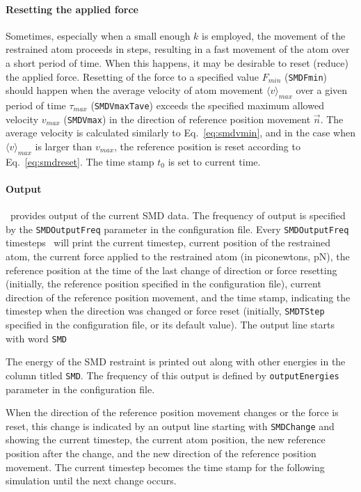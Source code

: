 \paragraph{Resetting the applied force}

Sometimes, especially when a small enough $k$ is employed, the
movement of the restrained atom proceeds in steps, resulting in a fast
movement of the atom over a short period of time. When this happens,
it may be desirable to reset (reduce) the applied force. Resetting of
the force to a specified value $F_{min}$ ({\tt SMDFmin}) should happen
when the average velocity of atom movement $\langle v\rangle_{max}$
over a given period of time $\tau_{max}$ ({\tt SMDVmaxTave}) exceeds
the specified maximum allowed velocity $v_{max}$ ({\tt SMDVmax}) in
the direction of reference position movement $\vec n$. The average
velocity is calculated similarly to Eq.~\ref{eq:smdvmin}, and in the
case when $\langle v\rangle_{max}$ is larger than $v_{max}$, the
reference position is reset according to Eq.~\ref{eq:smdreset}. The
time stamp $t_0$ is set to current time.


\paragraph{Output}

\NAMD\ provides output of the current SMD data. The frequency of
output is specified by the \verb!SMDOutputFreq! parameter in the
configuration file. Every \verb!SMDOutputFreq! timesteps \NAMD\ will
print the current timestep, current position of the restrained atom,
the current force applied to the restrained atom (in piconewtons, pN),
the reference position at the time of the last change of
direction or force resetting (initially, the reference position
specified in the configuration file), current direction of the
reference position movement, and the time stamp, indicating the
timestep when the direction was changed or force reset (initially, 
\verb!SMDTStep! specified in the configuration file, or its default
value). The output line starts with word {\tt SMD}

The energy of the SMD restraint is printed out along with other
energies in the column titled {\tt SMD}. The frequency of this output
is defined by \verb!outputEnergies! parameter in the configuration
file. 

When the direction of the reference position movement changes or the
force is reset, this change is indicated by an output line starting
with {\tt SMDChange} and showing the current timestep, the current
atom position, the new reference position after the change, and the
new direction of the reference position movement. The current timestep
becomes the time stamp for the following simulation until the next
change occurs.



